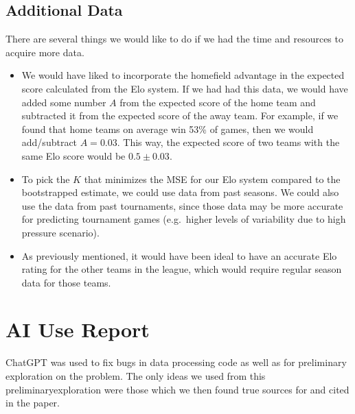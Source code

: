 \documentclass{article}
\begin{document}
\subsection{Additional Data}
There are several things we would like to do if we had the time and resources to acquire more data.
\begin{itemize}
    \item We would have liked to incorporate the homefield advantage in the expected score calculated from the Elo system. If we had had this data, we would have added some number $A$ from the expected score of the home team and subtracted it from the expected score of the away team. For example, if we found that home teams on average win 53\% of games, then we would add/subtract $A=0.03$. This way, the expected score of two teams with the same Elo score would be $0.5 \pm 0.03$. 
    \item To pick the $K$ that minimizes the MSE for our Elo system compared to the bootstrapped estimate, we could use data from past seasons. We could also use the data from past tournaments, since those data may be more accurate for predicting tournament games (e.g.\ higher levels of variability due to high pressure scenario).
    \item As previously mentioned, it would have been ideal to have an accurate Elo rating for the other teams in the league, which would require regular season data for those teams.
\end{itemize}




\newpage

\section{AI Use Report}
ChatGPT was used to fix bugs in data processing code as well as for preliminary exploration on the problem. The only ideas we used from this preliminaryexploration were those which we then found true sources for and cited in the paper. 
\end{document}
